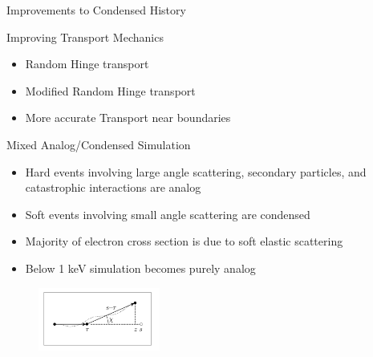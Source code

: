 \documentclass{beamer}
\begin{document}
  \begin{frame}{Improvements to Condensed History}

  \begin{block}{Improving Transport Mechanics}

    \begin{itemize}
      \item Random Hinge transport 
      \item Modified Random Hinge transport
      \item More accurate Transport near boundaries
    \end{itemize}
  
  \end{block}
    
  \begin{block}{Mixed Analog/Condensed Simulation}
    \begin{itemize}
      \item Hard events involving large angle scattering, secondary particles, and
catastrophic interactions are analog
      \item Soft events involving small angle scattering are condensed
      \item Majority of electron cross section is due to soft elastic scattering
      \item Below 1 keV simulation becomes purely analog
    \end{itemize}    
  \end{block}  
    
    \begin{figure}
     \includegraphics[width=40mm, x=-10cm]{random_hinge.png}
   \end{figure}
\end{frame}
\end{document}
